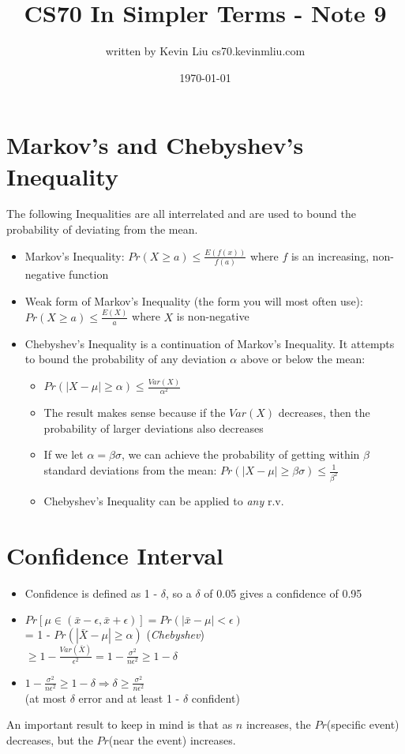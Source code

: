 \documentclass[a4paper]{article}
\title{CS70 In Simpler Terms - Note 9}
\author{written by Kevin Liu cs70.kevinmliu.com}
\date{\today}
\begin{document}
\maketitle

\section{Markov's and Chebyshev's Inequality}
The following Inequalities are all interrelated and are used to bound the probability of deviating from the mean.
\begin{itemize}
    \item Markov's Inequality: $Pr(X\geq a) \leq \frac{E(f(x))}{f(a)}$ where $f$ is an increasing, non-negative function
    \item Weak form of Markov's Inequality (the form you will most often use): $Pr(X\geq a) \leq \frac{E(X)}{a}$ where $X$ is non-negative
    \item Chebyshev's Inequality is a continuation of Markov's Inequality. It attempts to bound the probability of any deviation $\alpha$ above or below the mean:
    \begin{itemize}
        \item $Pr(|X-\mu| \geq \alpha) \leq \frac{Var(X)}{\alpha^2}$
        \item The result makes sense because if the $Var(X)$ decreases, then the probability of larger deviations also decreases
        \item If we let $\alpha  = \beta \sigma$, we can achieve the probability of getting within $\beta$ standard deviations from the mean: $Pr(|X-\mu| \geq \beta \sigma) \leq \frac{1}{\beta^2}$
        \item Chebyshev's Inequality can be applied to \textit{any} r.v.
     \end{itemize}
\end{itemize}
\section{Confidence Interval}
\begin{itemize}
        \item Confidence is defined as 1 - $\delta$, so a $\delta $ of 0.05 gives a confidence of 0.95
        \item $Pr[\mu \in (\bar x - \epsilon, \bar x + \epsilon)] = Pr(|\bar x - \mu| < \epsilon)$ \\
        = 1 - $Pr(|\bar X-\mu| \geq \alpha)$ (\textit{Chebyshev})\\
        $\geq 1 - \frac{Var(\bar X)}{\epsilon^2} = 1 - \frac{\sigma^2}{n\epsilon^2} \geq 1 - \delta$
        \item $1 - \frac{\sigma^2}{n\epsilon^2} \geq 1 - \delta \Rightarrow \delta \geq \frac{\sigma^2}{n\epsilon^2}$\\ (at most $\delta$ error and at least 1 - $\delta$ confident)
\end{itemize}
An important result to keep in mind is that as $n$ increases, the $Pr$(specific event) decreases, but the $Pr$(near the event) increases.
\end{document}

